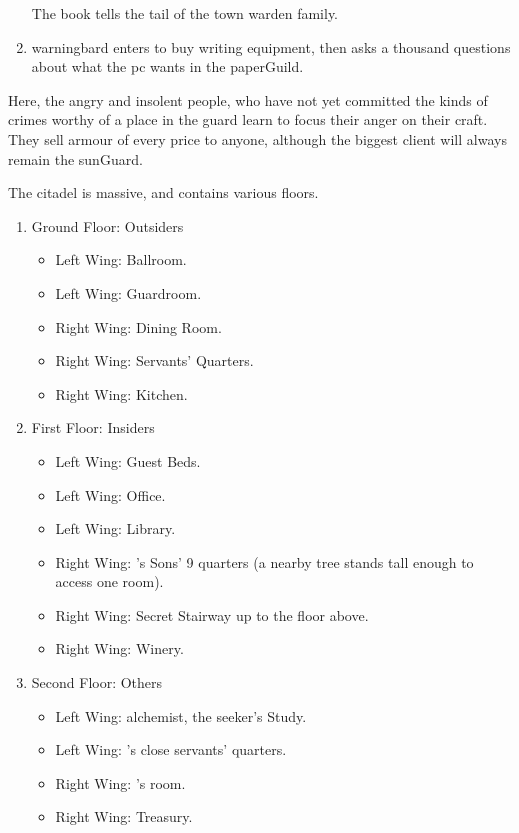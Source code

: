 \begin{multicols}{2}
\begin{enumerate}
  The book tells the tail of the \gls{town} \gls{warden} family.
  \item
  \Gls{warningbard} enters to buy writing equipment, then asks a thousand questions about what the \gls{pc} wants in the \gls{paperGuild}.
\end{enumerate}


Here, the angry and insolent people, who have not yet committed the kinds of crimes worthy of a place in the \gls{guard} learn to focus their anger on their craft.
They sell armour of every price to anyone, although the biggest client will always remain the \gls{sunGuard}.


The citadel is massive, and contains various floors.

\begin{enumerate}
  \item{Ground Floor: Outsiders}
    \begin{itemize}
      \item{Left Wing: Ballroom.}
      \item
      Left Wing: Guardroom.
      \item
      Right Wing: Dining Room.
      \item
      Right Wing: Servants' Quarters.
      \item
      Right Wing: Kitchen.
    \end{itemize}
  \item{First Floor: Insiders}
    \begin{itemize}
      \item
      Left Wing: Guest Beds.
      \item
      Left Wing: Office.
      \item
      Left Wing: Library.
      \item
      Right Wing: 's Sons' 9 quarters (a nearby tree stands tall enough to access one room).
      \item
      Right Wing: Secret Stairway up to the floor above.
      \item
      Right Wing: Winery.
    \end{itemize}
  \item
  Second Floor: Others
    \begin{itemize}
      \item
      Left Wing: \gls{alchemist}, the \gls{seeker}'s Study.
      \item
      Left Wing: 's close servants' quarters.
      \item
      Right Wing: 's room.
      \item
      Right Wing: Treasury.
    \end{itemize}
\end{enumerate}


\end{multicols}
